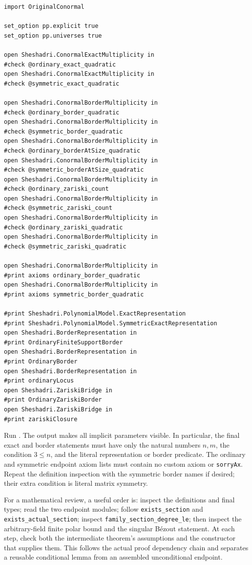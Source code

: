\begingroup\small
\begin{verbatim}
import OriginalConormal

set_option pp.explicit true
set_option pp.universes true

open Sheshadri.ConormalExactMultiplicity in
#check @ordinary_exact_quadratic
open Sheshadri.ConormalExactMultiplicity in
#check @symmetric_exact_quadratic

open Sheshadri.ConormalBorderMultiplicity in
#check @ordinary_border_quadratic
open Sheshadri.ConormalBorderMultiplicity in
#check @symmetric_border_quadratic
open Sheshadri.ConormalBorderMultiplicity in
#check @ordinary_borderAtSize_quadratic
open Sheshadri.ConormalBorderMultiplicity in
#check @symmetric_borderAtSize_quadratic
open Sheshadri.ConormalBorderMultiplicity in
#check @ordinary_zariski_count
open Sheshadri.ConormalBorderMultiplicity in
#check @symmetric_zariski_count
open Sheshadri.ConormalBorderMultiplicity in
#check @ordinary_zariski_quadratic
open Sheshadri.ConormalBorderMultiplicity in
#check @symmetric_zariski_quadratic

open Sheshadri.ConormalBorderMultiplicity in
#print axioms ordinary_border_quadratic
open Sheshadri.ConormalBorderMultiplicity in
#print axioms symmetric_border_quadratic

#print Sheshadri.PolynomialModel.ExactRepresentation
#print Sheshadri.PolynomialModel.SymmetricExactRepresentation
open Sheshadri.BorderRepresentation in
#print OrdinaryFiniteSupportBorder
open Sheshadri.BorderRepresentation in
#print OrdinaryBorder
open Sheshadri.BorderRepresentation in
#print ordinaryLocus
open Sheshadri.ZariskiBridge in
#print OrdinaryZariskiBorder
open Sheshadri.ZariskiBridge in
#print zariskiClosure
\end{verbatim}
\endgroup

Run \texttt{}.  The output makes
all implicit parameters visible.  In particular, the final exact and
border statements must have only the natural numbers $n,m$, the condition
$3\leq n$, and the literal representation or border predicate.  The
ordinary and symmetric endpoint axiom lists must contain no custom axiom
or \nolinkurl{sorryAx}.  Repeat the definition inspection with the symmetric
border names if desired; their extra condition is literal matrix symmetry.

For a mathematical review, a useful order is: inspect the definitions and
final types; read the two endpoint modules; follow
\nolinkurl{exists_section} and \nolinkurl{exists_actual_section}; inspect
\nolinkurl{family_section_degree_le}; then inspect the arbitrary-field
finite polar bound and the singular B\'ezout statement.  At each step,
check both the intermediate theorem's assumptions and the constructor
that supplies them.  This follows the actual proof dependency chain and
separates a reusable conditional lemma from an assembled unconditional
endpoint.

\endgroup
